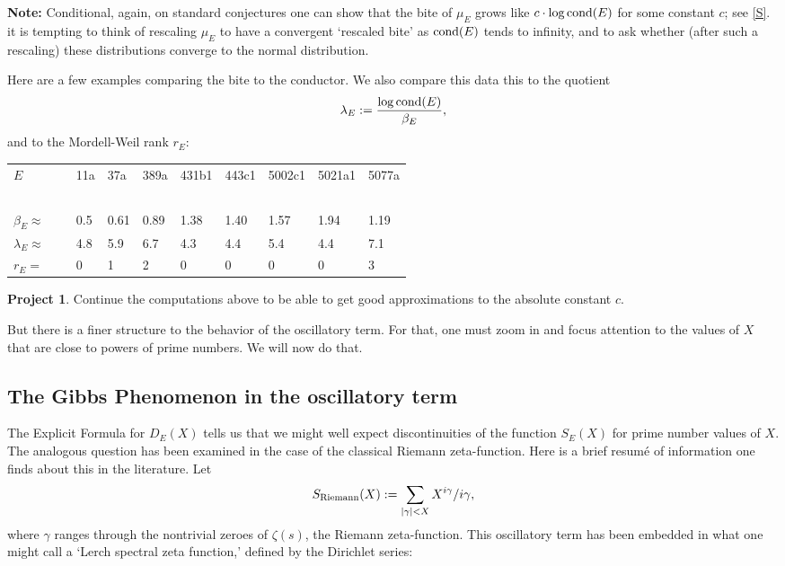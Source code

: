 \documentclass[11pt]{article}
\theoremstyle{plain}
\theoremstyle{definition}
\newtheorem{project}[theorem]{Project}
\numberwithin{equation}{section}
\numberwithin{figure}{section}
\numberwithin{table}{section}
\begin{document}
    {\bf  Note: } Conditional, again,  on standard conjectures  one can show that the bite of $\mu_E$  grows like $c\cdot \log {\rm cond}(E)$ for some constant $c$; see \ref{S}. it is tempting to think of rescaling $\mu_E$ to have a convergent `rescaled bite' as ${\rm cond}(E)$ tends to infinity, and to ask whether (after such a rescaling) these distributions converge to the normal distribution.

 Here are a few examples comparing the bite to the conductor. We also compare this data this to the quotient $$\lambda_E:={\frac{ \log {\rm cond}(E)}{\beta_E}},$$ and to the Mordell-Weil rank $r_E$:



  \begin{tabular}{llllllllll}
  $E$   &\ & 11a & 37a & 389a & 431b1 & 443c1 & 5002c1 & 5021a1 & 5077a\\
\  &\ &\  &\  &\  &\ &\ &\ &\ &\ \\
  $\beta_E \approx $  &\ & 0.5 & 0.61 & 0.89 & 1.38 & 1.40 & 1.57 & 1.94 & 1.19\\
  $\lambda_E  \approx$  &\ & 4.8 & 5.9 & 6.7 & 4.3 & 4.4 & 5.4 & 4.4 & 7.1\\
  $r_E =$   &\ & 0 & 1 & 2 & 0 & 0 & 0 & 0 & 3 \end{tabular}
\vskip10pt
\begin{project} Continue the computations above to be able to get good approximations to the absolute constant $c$. \end{project}

  But there is a finer structure to the behavior of the oscillatory term. For that, one must zoom in and focus attention to the values of $X$ that are close to powers of prime numbers. We will now do that.


 \subsection{ The Gibbs Phenomenon in the oscillatory term} The Explicit Formula for $D_E(X)$ tells us that we might well expect discontinuities of the function $S_E(X)$ for prime number values of $X$. The analogous question has been  examined in the case of the classical Riemann zeta-function.  Here is a brief resum{\'e} of information one finds about this in the literature. Let $$S_{\rm Riemann}(X): = \sum_{|\gamma|<X}X^{i\gamma}/i\gamma,$$ where $\gamma$ ranges through the nontrivial zeroes of $\zeta(s)$, the Riemann zeta-function. This oscillatory term has been  embedded in what one might call a `Lerch spectral zeta function,' defined by the Dirichlet series:
\end{document}
